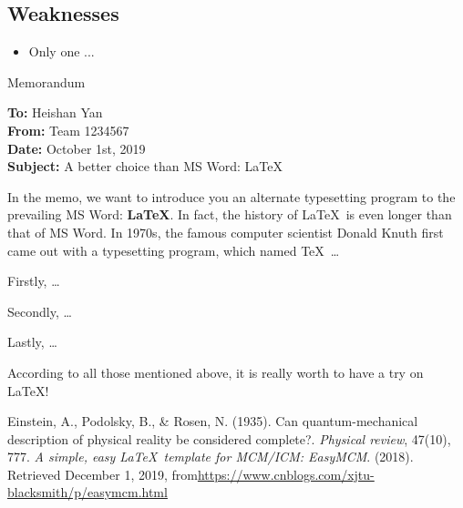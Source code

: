 \documentclass[12pt]{article}  %
\begin{document}
\subsection{Weaknesses}
\begin{itemize}
    \item Only one ...
 \end{itemize}










\begin{letter}{Memorandum}
\begin{flushleft}  %
\textbf{To:} Heishan Yan\\
\textbf{From:} Team 1234567\\
\textbf{Date:} October 1st, 2019\\
\textbf{Subject:} A better choice than MS Word: \LaTeX
\end{flushleft}

In the memo, we want to introduce you an alternate typesetting program to the prevailing MS Word: \textbf{\LaTeX}. In fact, the history of \LaTeX\ is even longer than that of MS Word. In 1970s, the famous computer scientist Donald Knuth first came out with a typesetting program, which named \TeX\ \ldots

Firstly, \ldots

Secondly, \ldots

Lastly, \ldots

According to all those mentioned above, it is really worth to have a try on \LaTeX! 
\end{letter}


\begin{thebibliography}{99}
 Einstein, A., Podolsky, B., \& Rosen, N. (1935). Can quantum-mechanical description of physical reality be considered complete?. \emph{Physical review}, 47(10), 777.
 \emph{A simple, easy \LaTeX\ template for MCM/ICM: EasyMCM}. (2018). Retrieved December 1, 2019, from\url{https://www.cnblogs.com/xjtu-blacksmith/p/easymcm.html}
\end{thebibliography}
\end{document}
